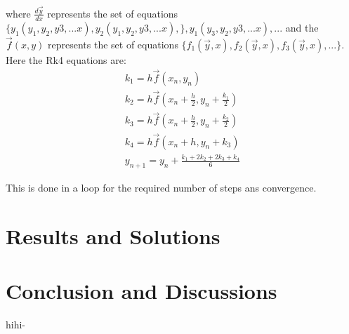 \documentclass{article}
\begin{document}
\begin{multicols}{2}
where $\frac{d\vec{y}}{dx}$ represents the set of equations $\{ y_1(y_1,y_2,y3,...x) ,y_2(y_1,y_2,y3,...x) , \},y_1(y_3,y_2,y3,...x),...$  and the $\vec{f}(x,y)$ represents the set of equations $\{ f_1(\vec{y},x),f_2(\vec{y},x),f_3(\vec{y},x),... \}$. Here the Rk4 equations are:
\begin{eqnarray}
    k_1 = h\vec{f}(x_n,y_n)\\
    k_2 = h\vec{f}(x_n + \frac{h}{2},y_n + \frac{k_1}{2})\\
    k_3 = h\vec{f}(x_n + \frac{h}{2},y_n + \frac{k_2}{2})\\
    k_4 = h\vec{f}(x_n + h,y_n + k_3)\\
    y_{n+1} = y_n + \frac{k_1 + 2k_2 + 2k_3 + k_4}{6}
\end{eqnarray}

This is done in a loop for the required number of steps ans convergence. 
\section{\label{observations}Results and Solutions}



\section{\label{Conclusion}Conclusion and Discussions}

hihi-\cite{ROOT}

\end{multicols}


\end{document}
